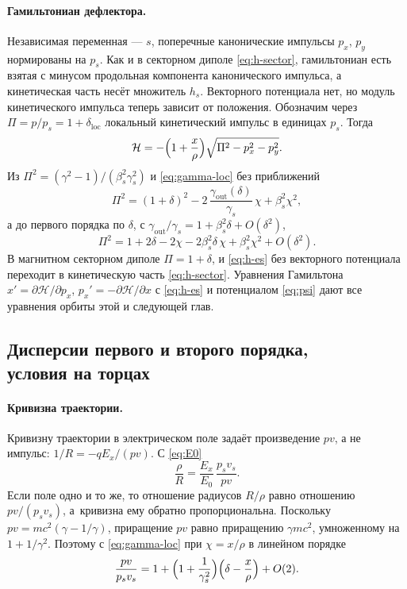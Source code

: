 \paragraph{Гамильтониан дефлектора.}
Независимая переменная --- $s$, поперечные канонические импульсы $p_x$, $p_y$ нормированы на $p_s$. Как и в секторном диполе \eqref{eq:h-sector}, гамильтониан есть взятая с минусом продольная компонента канонического импульса, а кинетическая часть несёт множитель $h_s$. Векторного потенциала нет, но модуль кинетического импульса теперь зависит от положения. Обозначим через $\Pi=p/p_s=1+\delta_{\mathrm{loc}}$ локальный кинетический импульс в единицах $p_s$. Тогда
\begin{equation}
\label{eq:h-es}
\mathcal{H}=-\Bigl(1+\frac{x}{\rho}\Bigr)\sqrt{\Pi^2-p_x^2-p_y^2}.
\end{equation}
Из $\Pi^2=(\gamma^2-1)/(\beta_s^2\gamma_s^2)$ и \eqref{eq:gamma-loc} без приближений
\begin{equation*}
\Pi^2=(1+\delta)^2-2\,\frac{\gamma_{\mathrm{out}}(\delta)}{\gamma_s}\,\chi+\beta_s^2\chi^2,
\end{equation*}
а до первого порядка по $\delta$, с $\gamma_{\mathrm{out}}/\gamma_s=1+\beta_s^2\delta+O(\delta^2)$,
\begin{equation}
\label{eq:Pi2-es}
\Pi^2=1+2\delta-2\chi-2\beta_s^2\delta\,\chi+\beta_s^2\chi^2+O(\delta^2).
\end{equation}
В магнитном секторном диполе $\Pi=1+\delta$, и \eqref{eq:h-es} без векторного потенциала переходит в кинетическую часть \eqref{eq:h-sector}. Уравнения Гамильтона $x'=\partial\mathcal{H}/\partial p_x$, $p_x'=-\partial\mathcal{H}/\partial x$ с \eqref{eq:h-es} и потенциалом \eqref{eq:psi} дают все уравнения орбиты этой и следующей глав.

\subsection[Дисперсии первого и второго порядка, условия на торцах]{Дисперсии первого и второго порядка,\\ условия на торцах}
\label{sec:es-D}

\paragraph{Кривизна траектории.}
Кривизну траектории в электрическом поле задаёт произведение $pv$, а не импульс: $1/R=-qE_x/(pv)$. С \eqref{eq:E0}
\begin{equation*}
\frac{\rho}{R}=\frac{E_x}{E_0}\,\frac{p_sv_s}{pv}.
\end{equation*}
Если поле одно и то же, то отношение радиусов $R/\rho$ равно отношению $pv/(p_sv_s)$, а~кривизна ему обратно пропорциональна. Поскольку $pv=mc^2(\gamma-1/\gamma)$, приращение $pv$ равно приращению $\gamma mc^2$, умноженному на $1+1/\gamma^2$. Поэтому с \eqref{eq:gamma-loc} при $\chi=x/\rho$ в линейном порядке
\begin{equation}
\label{eq:cmp-pv}
\frac{pv}{p_sv_s}
=1+\Bigl(1+\frac{1}{\gamma_s^2}\Bigr)
\Bigl(\delta-\frac{x}{\rho}\Bigr)+O(2).
\end{equation}

